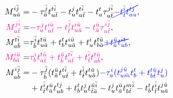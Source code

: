\documentclass[a4paper,12pt,oneside]{book}
\newcommand{\blue}[1]{{\color{blue} #1}}
\newcommand{\magenta}[1]{{\color{magenta} #1}}
\newcommand{\spa}[1]{{#1}}
\newcommand{\spb}[1]{\bar{#1}}
\begin{document}
\begin{align}
M^{\spa{i}\spb{j}}_{\spa{u}\spb{a}} = &-\tau^{\spb{j}}_{\spb{a}} t^{\spa{t}\spb{i}}_{\spa{u}\spb{t}} 
                                       -t^{\spa{j}}_{\spa{u}} t^{\spa{t}\spb{i}}_{\spa{a}\spb{t}}
                                       -t^{\spa{t}}_{\spa{a}} \tau^{\spa{j}\spb{i}}_{\spa{u}\spb{t}} 
                         \blue{\cancel{-t^{\spb{i}}_{\spb{t}} t^{\spa{t}\spa{j}}_{\spa{a}\spa{u}}}},\\
\magenta{M^{\spa{j}\spb{i}}_{\spa{a}\spb{t}}} = &\magenta{-\tau^{\spa{j}}_{\spa{a}} t^{\spa{i}\spb{u}}_{\spa{u}\spb{t}} 
                                                -t^{\spb{j}}_{\spb{t}} t^{\spa{i}\spb{u}}_{\spa{u}\spb{a}}
                                                -t^{\spb{u}}_{\spb{a}} \tau^{\spa{i}\spb{j}}_{\spa{u}\spb{t}}}, \\
M^{\spa{t}\spb{i}}_{\spa{a}\spb{b}} = &\tau^{\spb{i}}_{\spb{b}} t^{\spa{t}\spb{u}}_{\spa{u}\spb{a}} 
                                      +t^{\spa{t}}_{\spa{b}} t^{\spa{i}\spb{u}}_{\spa{u}\spb{a}}
                                      +t^{\spa{i}}_{\spa{u}} t^{\spa{t}\spb{u}}_{\spa{b}\spb{a}}
                        \blue{\cancel{+t^{\spb{u}}_{\spb{a}} t^{\spa{i}\spa{t}}_{\spa{u}\spa{b}}}},\\
\magenta{M^{\spa{i}\spb{u}}_{\spa{b}\spb{a}}} = &\magenta{\tau^{\spa{i}}_{\spa{b}} t^{\spa{t}\spb{u}}_{\spa{a}\spb{t}}
                                                +t^{\spb{u}}_{\spb{b}} t^{\spa{t}\spb{i}}_{\spa{a}\spb{t}}
                                                +t^{\spb{i}}_{\spb{t}} t^{\spa{t}\spb{u}}_{\spa{a}\spb{b}}},\\
M^{\spa{i}\spb{j}}_{\spa{a}\spb{b}} = &-\tau^{\spb{j}}_{\spb{b}} (t^{\spb{u}}_{\spb{a}} t^{\spa{t}\spb{i}}_{\spa{u}\spb{t}}
                                      +t^{\spb{i}}_{\spb{t}} t^{\spa{t}\spb{u}}_{\spa{u}\spb{a}})
                                \blue{-\tau^{\spa{i}}_{\spa{a}}(t^{\spa{j}\spb{u}}_{\spa{u}\spb{m}} t^{\spa{t}}_{\spa{b}}
                                      +t^{\spa{t}\spb{u}}_{\spa{b}\spb{t}} t^{\spa{j}}_{\spa{u}})} \nonumber \\
                                     &+t^{\spb{i}}_{\spb{t}} t^{\spb{u}}_{\spb{a}} t^{\spa{t}\spa{j}}_{\spa{u}\spa{b}} 
                                      +t^{\spa{t}}_{\spa{b}} t^{\spa{j}}_{\spa{u}} t^{\spb{u}\spb{i}}_{\spb{t}\spb{a}}
                                      -t^{\spa{j}}_{\spa{u}} t^{\spb{u}}_{\spb{a}} t^{\spa{m}\spb{i}}_{\spa{b}\spb{t}}
                                      -t^{\spa{t}}_{\spa{b}} t^{\spb{i}}_{\spb{t}} t^{\spa{j}\spb{u}}_{\spa{u}\spb{a}} \nonumber \\

\end{align}
\end{document}
